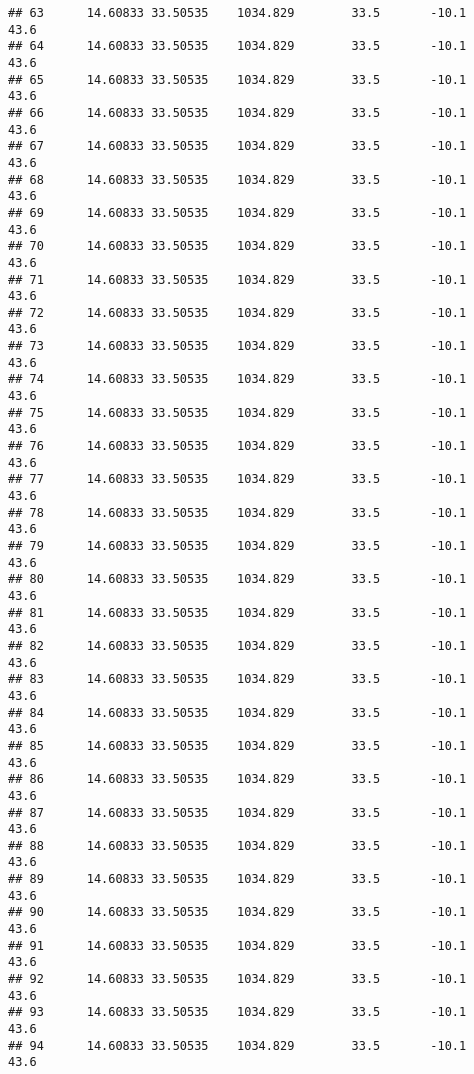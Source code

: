 \documentclass[]{article}
\begin{document}
\begin{verbatim}
## 63      14.60833 33.50535    1034.829        33.5       -10.1              43.6
## 64      14.60833 33.50535    1034.829        33.5       -10.1              43.6
## 65      14.60833 33.50535    1034.829        33.5       -10.1              43.6
## 66      14.60833 33.50535    1034.829        33.5       -10.1              43.6
## 67      14.60833 33.50535    1034.829        33.5       -10.1              43.6
## 68      14.60833 33.50535    1034.829        33.5       -10.1              43.6
## 69      14.60833 33.50535    1034.829        33.5       -10.1              43.6
## 70      14.60833 33.50535    1034.829        33.5       -10.1              43.6
## 71      14.60833 33.50535    1034.829        33.5       -10.1              43.6
## 72      14.60833 33.50535    1034.829        33.5       -10.1              43.6
## 73      14.60833 33.50535    1034.829        33.5       -10.1              43.6
## 74      14.60833 33.50535    1034.829        33.5       -10.1              43.6
## 75      14.60833 33.50535    1034.829        33.5       -10.1              43.6
## 76      14.60833 33.50535    1034.829        33.5       -10.1              43.6
## 77      14.60833 33.50535    1034.829        33.5       -10.1              43.6
## 78      14.60833 33.50535    1034.829        33.5       -10.1              43.6
## 79      14.60833 33.50535    1034.829        33.5       -10.1              43.6
## 80      14.60833 33.50535    1034.829        33.5       -10.1              43.6
## 81      14.60833 33.50535    1034.829        33.5       -10.1              43.6
## 82      14.60833 33.50535    1034.829        33.5       -10.1              43.6
## 83      14.60833 33.50535    1034.829        33.5       -10.1              43.6
## 84      14.60833 33.50535    1034.829        33.5       -10.1              43.6
## 85      14.60833 33.50535    1034.829        33.5       -10.1              43.6
## 86      14.60833 33.50535    1034.829        33.5       -10.1              43.6
## 87      14.60833 33.50535    1034.829        33.5       -10.1              43.6
## 88      14.60833 33.50535    1034.829        33.5       -10.1              43.6
## 89      14.60833 33.50535    1034.829        33.5       -10.1              43.6
## 90      14.60833 33.50535    1034.829        33.5       -10.1              43.6
## 91      14.60833 33.50535    1034.829        33.5       -10.1              43.6
## 92      14.60833 33.50535    1034.829        33.5       -10.1              43.6
## 93      14.60833 33.50535    1034.829        33.5       -10.1              43.6
## 94      14.60833 33.50535    1034.829        33.5       -10.1              43.6

\end{verbatim}
\end{document}
